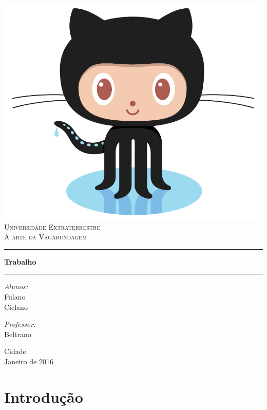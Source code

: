 \documentclass[11pt]{article}
\begin{document}
\begin{center}
\thispagestyle{empty}
\includegraphics[width=0.2\linewidth]{logo.png} \\[0.3cm]
\textsc{\LARGE Universidade Extraterrestre}\\[1.5cm]

\textsc{\large A arte da Vagabundagem}\\[0.5cm]
\hrule \vspace{0.4cm}
{ \huge \bfseries Trabalho  \\[0.4cm] }
\hrule \vspace{1.5cm}
\vspace{1cm} %

\begin{minipage}{0.5\textwidth}
\begin{flushleft} \large
\emph{Alunos:}\\
Fulano \\
Ciclano
\end{flushleft}
\end{minipage}
\begin{minipage}{0.4\textwidth}
\begin{flushright} \large
\emph{Professor:} \\
Beltrano
\end{flushright}
\end{minipage}

\vfill

{\large Cidade \\[0.4cm] Janeiro de 2016}

\end{center}

\newpage
\tableofcontents
\newpage

\section{Introdução}
\end{document}
